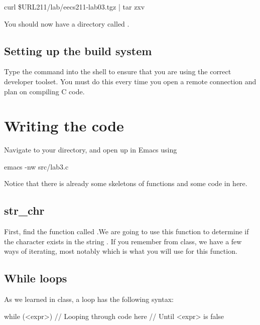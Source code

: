 \documentclass{tufte-handout}
\def\ThisLabBase{eecs211-lab03}
\begin{document}
\begin{CmdLine}
  \prompt curl \$URL211/lab/\ThisLabBase.tgz | tar zxv
\end{CmdLine}

You should now have a directory called \filename{\ThisLabBase}.

\subsection{Setting up the build system}
Type the  command into the shell to ensure that you are
using the correct developer toolset. You must do this every time you
open a remote connection and plan on compiling C code.

\section{Writing the code}
Navigate to your \filename{\LabBaseUrl} directory, and open up
 in Emacs using
\begin{CmdLine}
  \prompt emacs -nw src/lab3.c
\end{CmdLine}
Notice that there is already some skeletons of functions and some code in  here.

\subsection{str\_chr}
First, find the function called
.We are going to use this function to determine if the character  exists in the string . If you remember from class, we have a few ways of iterating, most notably  which is what you will use for this function.

\subsection{While loops}
As we learned in class, a  loop has the following
syntax:

\begin{Code}
    while (<expr>) {
        // Looping through code here
        // Until <expr> is false
    }
\end{Code}
\end{document}
